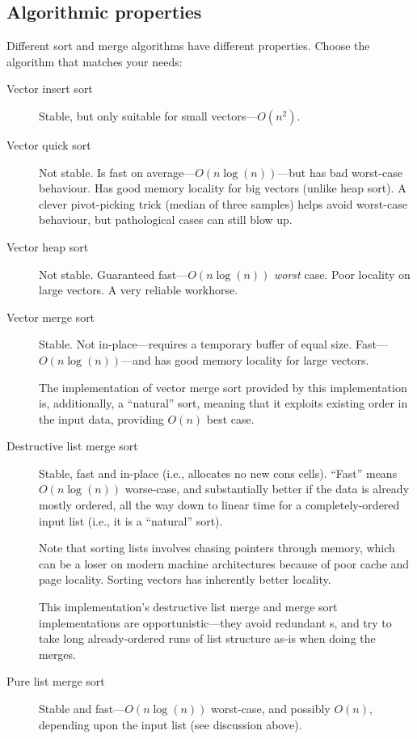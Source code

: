 \subsection{Algorithmic properties}

Different sort and merge algorithms have different properties.
Choose the algorithm that matches your needs:

\begin{description}
\item[Vector insert sort]
  Stable, but only suitable for small vectors---$O(n^2)$.
\item[Vector quick sort]
  Not stable. Is fast on average---$O(n\log(n))$---but has bad worst-case
  behaviour. Has good memory locality for big vectors (unlike heap sort). 
  A clever pivot-picking trick (median of three samples) helps avoid 
  worst-case behaviour, but pathological cases can still blow up.
\item[Vector heap sort]
  Not stable. Guaranteed fast---$O(n\log(n))$ \emph{worst} case. Poor
  locality on large vectors. A very reliable workhorse.
\item[Vector merge sort]
    Stable. Not in-place---requires a temporary buffer of equal size. 
    Fast---$O(n\log(n))$---and has good memory locality for large vectors.
    
    The implementation of vector merge sort provided by this
    implementation is, additionally, a ``natural'' sort, meaning that it
    exploits existing order in the input data, providing $O(n)$ best case.
\item[Destructive list merge sort]
    Stable, fast and in-place (i.e., allocates no new cons cells). ``Fast''
    means $O(n\log(n))$ worse-case, and substantially better if the data
    is already mostly ordered, all the way down to linear time for
    a completely-ordered input list (i.e., it is a ``natural'' sort).

    Note that sorting lists involves chasing pointers through memory, which
    can be a loser on modern machine architectures because of poor cache and
    page locality.
    Sorting vectors has inherently better locality.
    
    This implementation's destructive list merge and merge sort
    implementations are opportunistic---they avoid redundant
    s, and try to take long
    already-ordered runs of list structure as-is when doing the merges.
\item[Pure list merge sort]
  Stable and fast---$O(n\log(n))$ worst-case, and possibly $O(n)$,
  depending upon the input list (see discussion above).
\end{description}

